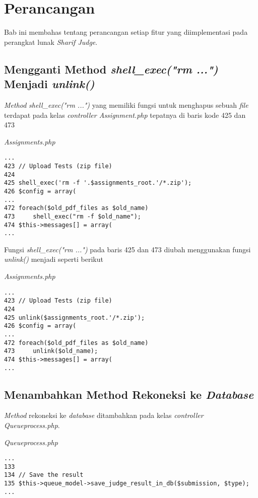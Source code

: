 \chapter{Perancangan}
\label{chap:perancangan}

Bab ini membahas tentang perancangan setiap fitur yang diimplementasi pada perangkat lunak \textit{Sharif Judge}. 

\section{Mengganti Method \textit{shell\_exec("rm ...")} Menjadi \textit{unlink()}}
\textit{Method} \textit{shell\_exec("rm ...")} yang memiliki fungsi untuk menghapus sebuah \textit{file} terdapat pada kelas \textit{controller Assignment.php} tepatnya di baris kode 425 dan 473

\textit{Assignments.php}
\begin{lstlisting}[basicstyle=\ttfamily, frame=single,
columns=fullflexible, keepspaces=true]
...
423	// Upload Tests (zip file)
424	
425	shell_exec('rm -f '.$assignments_root.'/*.zip');
426	$config = array(
...
472	foreach($old_pdf_files as $old_name)
473		shell_exec("rm -f $old_name");
474	$this->messages[] = array(
...
\end{lstlisting}

Fungsi \textit{shell\_exec("rm ...")} pada baris 425 dan 473 diubah menggunakan fungsi \textit{unlink()} menjadi seperti berikut

\textit{Assignments.php}
\begin{lstlisting}[basicstyle=\ttfamily, frame=single,
columns=fullflexible, keepspaces=true]
...
423	// Upload Tests (zip file)
424	
425	unlink($assignments_root.'/*.zip');
426	$config = array(
...
472	foreach($old_pdf_files as $old_name)
473		unlink($old_name);
474	$this->messages[] = array(
...
\end{lstlisting}

\section{Menambahkan Method Rekoneksi ke \textit{Database}}
\textit{Method} rekoneksi ke \textit{database} ditambahkan pada kelas \textit{controller Queueprocess.php}. 

\textit{Queueprocess.php}
\begin{lstlisting}[basicstyle=\ttfamily, frame=single,
columns=fullflexible, keepspaces=true]
...
133
134	// Save the result
135	$this->queue_model->save_judge_result_in_db($submission, $type);
...
\end{lstlisting}

